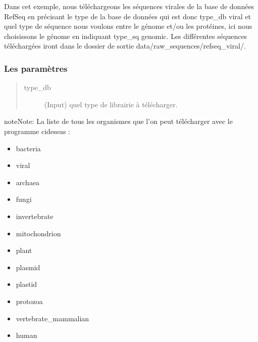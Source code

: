 \documentclass[letterpaper,10pt,french]{sphinxmanual}
\begin{document}
Dans cet exemple, nous téléchargeons les séquences virales de la base de données RefSeq en précisant le type de la base de données qui est donc \sphinxhyphen{}type\_db viral et quel type de séquence nous voulons entre le génome et/ou les protéines, ici nous choisissons le génome en indiquant \sphinxhyphen{}type\_sq genomic. Les différentes séquences téléchargées iront dans le dossier de sortie data/raw\_sequences/refseq\_viral/.


\subsubsection{Les paramètres}
\label{\detokenize{tutorial:id17}}\begin{quote}\begin{description}
\item[{\sphinxhyphen{}type\_db}] \leavevmode
(Input) quel type de librairie à télécharger.

\end{description}\end{quote}

\begin{sphinxadmonition}{note}{Note:}
La liste de tous les organismes que l’on peut télécharger avec le programme ci\sphinxhyphen{}dessus :
\begin{itemize}
\item {} 
bacteria

\item {} 
viral

\item {} 
archaea

\item {} 
fungi

\item {} 
invertebrate

\item {} 
mitochondrion

\item {} 
plant

\item {} 
plasmid

\item {} 
plastid

\item {} 
protozoa

\item {} 
vertebrate\_mammalian

\item {} 
human

\end{itemize}
\end{sphinxadmonition}
\end{document}
